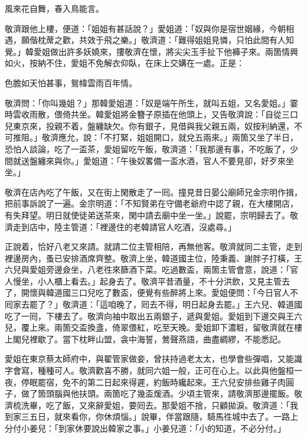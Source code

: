 \begin{myquote}
風來花自舞，春入鳥能言。
\end{myquote}

敬濟跟他上樓，便道：「姐姐有甚話說？」愛姐道：「奴與你是宿世姻緣，今朝相遇，願偕枕蓆之歡，共效于飛之樂。」敬濟道：「難得姐姐見憐，只怕此間有人知覺。」韓愛姐做出許多妖嬈來，摟敬濟在懷，{}將尖尖玉手扯下他褲子來。兩箇情興如火，按納不住，愛姐不免解衣仰臥，在床上交媾在一處。正是：

\begin{myquote}
色膽如天怕甚事，鴛幃雲雨百年情。
\end{myquote}

敬濟問：「你叫幾姐？」那韓愛姐道：「奴是端午所生，就叫五姐，又名愛姐。」霎時雲收雨散，偎倚共坐。韓愛姐將金簪子原插在他頭上，又告敬濟說：「自從三口兒東京來，投親不着，盤纏缺欠。你有銀子，見借與我父親五兩，奴按利納還，不可推阻。」敬濟應允，說：「不打緊，姐姐開口，就兌五兩來。」兩箇又坐了半日，恐怕人談論，吃了一盃茶，愛姐留吃午飯，敬濟道：「我那邊有事，不吃飯了，少間就送盤纏來與你。」愛姐道：「午後奴畧備一盃水酒，官人不要見卻，好歹來坐坐。」

敬濟在店內吃了午飯，又在街上閑散走了一囘。撞見昔日晏公廟師兄金宗明作揖，把前事訴說了一遍。金宗明道：「不知賢弟在守備老爺府中認了親，在大樓開店，有失拜望。明日就使徒弟送茶來，閑中請去廟中坐一坐。」說罷，宗明歸去了。敬濟走到店中，陸主管道：「裡邊住的老韓請官人吃酒，沒處尋。」

正說着，恰好八老又來請。就請二位主管相陪，再無他客。敬濟就同二主管，走到裡邊房內，蚤已安排酒席齊整。敬濟上坐，韓道國主位，陸秉義、謝胖子打橫，王六兒與愛姐旁邊僉坐，八老徃來篩酒下菜。吃過數盃，兩箇主管會意，說道：「官人慢坐，小人櫃上看去。」起身去了。敬濟平昔酒量，不十分洪飲，又見主管去了，開懷與韓道國三口兒吃了數盃，便覺有些醉將上來。愛姐便問：「今日官人不囘家去罷了？」敬濟道：「這咱晚了，囘去不得，明日起身去罷。」王六兒、韓道國吃了一囘，下樓去了。敬濟向袖中取出五兩銀子，遞與愛姐。愛姐到下邊交與王六兒，覆上來。兩箇交盃換盞，倚翠偎紅，吃至天晚。愛姐卸下濃粧，留敬濟就在樓上閣兒裡歇了。當下枕畔山盟，衾中海誓，鶯聲燕語，曲盡綢繆，不能悉記。

愛姐在東京蔡太師府中，與翟管家做妾，曾扶持過老太太，也學會些彈唱，又能識字會寫，種種可人。敬濟歡喜不勝，就同六姐一般，正可在心上。{}以此與他盤桓一夜，停眠罷宿，免不的第二日起來得遲，約飯時纔起來。王六兒安排些雞子肉圓子，做了箇頭腦與他扶頭。兩箇吃了幾盃煖酒。少頃主管來，請敬濟那邊擺飯。敬濟梳洗畢，吃了飯，又來辭愛姐，要囘去。那愛姐不捨，只顧拋淚。{}敬濟道：「我到家三五日，就來看你，你休煩惱。」說畢，伴當跟隨，騎馬徃城中去了。一路上分付小姜兒：「到家休要說出韓家之事。」小姜兒道：「小的知道，不必分付。」

